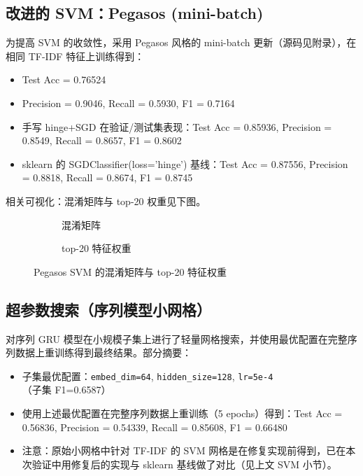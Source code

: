 \subsection{改进的 SVM：Pegasos (mini-batch)}
为提高 SVM 的收敛性，采用 Pegasos 风格的 mini-batch 更新（源码见附录），在相同 TF-IDF 特征上训练得到：
\begin{itemize}
    \item Test Acc = 0.76524
    \item Precision = 0.9046, Recall = 0.5930, F1 = 0.7164
    \item 手写 hinge+SGD 在验证/测试集表现：Test Acc = 0.85936, Precision = 0.8549, Recall = 0.8657, F1 = 0.8602
    \item sklearn 的 SGDClassifier(loss='hinge') 基线：Test Acc = 0.87556, Precision = 0.8818, Recall = 0.8674, F1 = 0.8745
\end{itemize}
相关可视化：混淆矩阵与 top-20 权重见下图。
\begin{figure}[htbp]
    \centering
    \begin{subfigure}[b]{0.48\textwidth}
        \centering
        \caption{混淆矩阵}
    \end{subfigure}\hfill
    \begin{subfigure}[b]{0.48\textwidth}
        \centering
        \caption{top-20 特征权重}
    \end{subfigure}
    \caption{Pegasos SVM 的混淆矩阵与 top-20 特征权重}
\end{figure}

\subsection{超参数搜索（序列模型小网格）}
对序列 GRU 模型在小规模子集上进行了轻量网格搜索，并使用最优配置在完整序列数据上重训练得到最终结果。部分摘要：
\begin{itemize}
    \item 子集最优配置：\texttt{embed\_dim=64}, \texttt{hidden\_size=128}, \texttt{lr=5e-4}（子集 F1=0.6587）
    \item 使用上述最优配置在完整序列数据上重训练（5 epochs）得到：Test Acc = 0.56836, Precision = 0.54339, Recall = 0.85608, F1 = 0.66480
    \item 注意：原始小网格中针对 TF-IDF 的 SVM 网格是在修复实现前得到，已在本次验证中用修复后的实现与 sklearn 基线做了对比（见上文 SVM 小节）。
\end{itemize}


